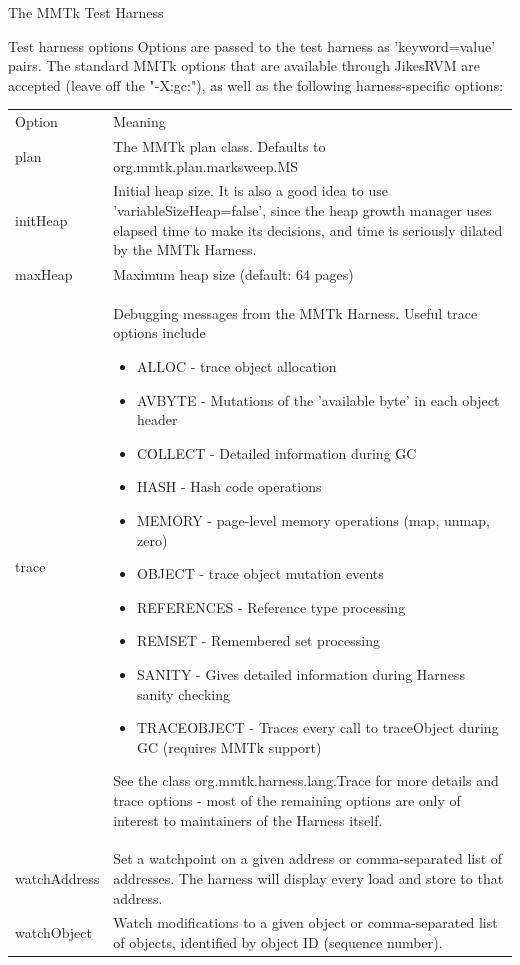 \begin{chapter}{The MMTk Test Harness}
\begin{section}{Test harness options}
Options are passed to the test harness as 'keyword=value' pairs.  The standard MMTk options that are available through JikesRVM are accepted (leave off the "-X:gc:"), as well as the following harness-specific options:

\begin{center}
\begin{longtable}{p{}p{}}
Option & Meaning \\
plan & The MMTk plan class.  Defaults to org.mmtk.plan.marksweep.MS \\
initHeap & Initial heap size.  It is also a good idea to use 'variableSizeHeap=false', since the heap growth manager uses elapsed time to make its decisions, and time is seriously dilated by the MMTk Harness. \\
maxHeap & Maximum heap size (default: 64 pages) \\
trace & Debugging messages from the MMTk Harness.  Useful trace options include
\begin{itemize}
  \item ALLOC - trace object allocation
  \item AVBYTE - Mutations of the 'available byte' in each object header
  \item COLLECT - Detailed information during GC
  \item HASH - Hash code operations
  \item MEMORY - page-level memory operations (map, unmap, zero)
  \item OBJECT - trace object mutation events 
  \item REFERENCES - Reference type processing
  \item REMSET - Remembered set processing
  \item SANITY - Gives detailed information during Harness sanity checking
  \item TRACEOBJECT - Traces every call to traceObject during GC (requires MMTk support)
\end{itemize}
    See the class org.mmtk.harness.lang.Trace for more details and trace options - most of the remaining options are only of interest to maintainers of the Harness itself. \\
watchAddress & Set a watchpoint on a given address or comma-separated list of addresses.  The harness will display every load and store to that address. \\
watchObject & Watch modifications to a given object or comma-separated list of objects, identified by object ID (sequence number). \\

\end{longtable}
\end{center}
\end{section}
\end{chapter}
